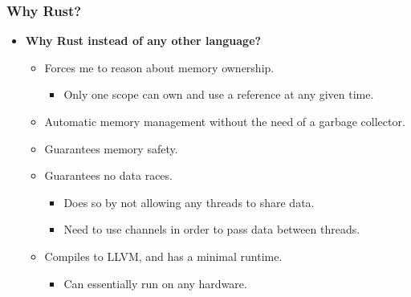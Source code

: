 \begin{frame}
  \frametitle{Why Rust?}
  \begin{itemize}
    \item \textbf{Why Rust instead of any other language?}\\
      \begin{itemize}
        \item<2-> Forces me to reason about memory ownership.
          \begin{itemize}
            \item<3-> Only one scope can own and use a reference at any given time.
          \end{itemize}
        \item<4-> Automatic memory management without the need of a garbage collector.
        \item<5-> Guarantees memory safety.
        \item<6-> Guarantees no data races.
          \begin{itemize}
            \item<7-> Does so by not allowing any threads to share data.\footnotemark
            \item<8-> Need to use channels in order to pass data between threads.
          \end{itemize}
        \item<9-> Compiles to LLVM, and has a minimal runtime.
          \begin{itemize}
            \item<10-> Can essentially run on any hardware.
          \end{itemize}
      \end{itemize}
  \end{itemize}

\end{frame}
